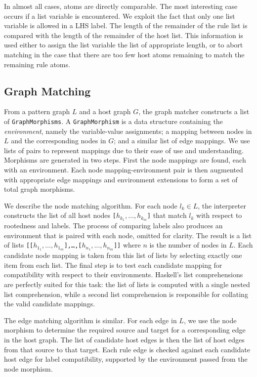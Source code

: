 In almost all cases, atoms are directly comparable. The most interesting case occurs if a list variable is encountered. We exploit the fact that only one list variable is allowed in a LHS label. The length of the remainder of the rule list is compared with the length of the remainder of the host list. This information is used either to assign the list variable the list of appropriate length, or to abort matching in the case that there are too few host atoms remaining to match the remaining rule atoms.

\subsection{Graph Matching}

From a pattern graph $L$ and a host graph $G$, the graph matcher constructs a list of \texttt{GraphMorphisms}. A \texttt{GraphMorphism} is a data structure containing the \textit{environment}, namely the variable-value assignments; a mapping between nodes in $L$ and the corresponding nodes in $G$; and a similar list of edge mappings. We use lists of pairs to represent mappings due to their ease of use and understanding. Morphisms are generated in two steps. First the node mappings are found, each with an environment. Each node mapping-environment pair is then augmented with appropriate edge mappings and environment extensions to form a set of total graph morphisms.

We describe the node matching algorithm. For each node $l_k \in L$, the interpreter constructs the list of all host nodes \texttt{[$h_{k_1}, \ldots, h_{k_m}$]} that match $l_k$ with respect to rootedness and labels. The process of comparing labels also produces an environment that is paired with each node, omitted for clarity. The result is a list of lists \texttt{[[$h_{1_1}, \ldots, h_{1_m}$],\ldots,[$h_{n_1}, \ldots, h_{n_m}$]]} where $n$ is the number of nodes in $L$. Each candidate node mapping is taken from this list of lists by selecting exactly one item from each list. The final step is to test each candidate mapping for compatibility with respect to their environments. Haskell's list comprehensions are perfectly suited for this task: the list of lists is computed with a single nested list comprehension, while a second list comprehension is responsible for collating the valid candidate mappings. 

The edge matching algorithm is similar. For each edge in $L$, we use the node morphism to determine the required source and target for a corresponding edge in the host graph. The list of candidate host edges is then the list of host edges from that source to that target. Each rule edge is checked against each candidate host edge for label compatibility, supported by the environment passed from the node morphism.

